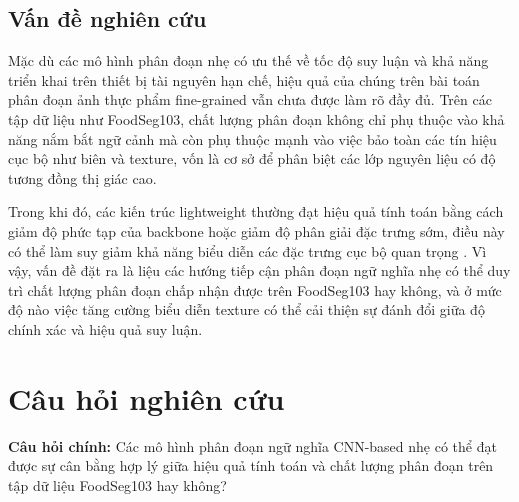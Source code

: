 \subsection{Vấn đề nghiên cứu}

Mặc dù các mô hình phân đoạn nhẹ có ưu thế về tốc độ suy luận và khả năng triển khai trên thiết bị tài nguyên hạn chế, hiệu quả của chúng trên bài toán phân đoạn ảnh thực phẩm fine-grained vẫn chưa được làm rõ đầy đủ. Trên các tập dữ liệu như FoodSeg103, chất lượng phân đoạn không chỉ phụ thuộc vào khả năng nắm bắt ngữ cảnh mà còn phụ thuộc mạnh vào việc bảo toàn các tín hiệu cục bộ như biên và texture, vốn là cơ sở để phân biệt các lớp nguyên liệu có độ tương đồng thị giác cao.

Trong khi đó, các kiến trúc lightweight thường đạt hiệu quả tính toán bằng cách giảm độ phức tạp của backbone hoặc giảm độ phân giải đặc trưng sớm, điều này có thể làm suy giảm khả năng biểu diễn các đặc trưng cục bộ quan trọng \cite{he2015residual, dong2020mobilenetv2}. Vì vậy, vấn đề đặt ra là liệu các hướng tiếp cận phân đoạn ngữ nghĩa nhẹ có thể duy trì chất lượng phân đoạn chấp nhận được trên FoodSeg103 hay không, và ở mức độ nào việc tăng cường biểu diễn texture có thể cải thiện sự đánh đổi giữa độ chính xác và hiệu quả suy luận.




\section{Câu hỏi nghiên cứu}
\textbf{Câu hỏi chính:}  
Các mô hình phân đoạn ngữ nghĩa CNN-based nhẹ có thể đạt được sự cân bằng hợp lý giữa hiệu quả tính toán và chất lượng phân đoạn trên tập dữ liệu FoodSeg103 hay không?


